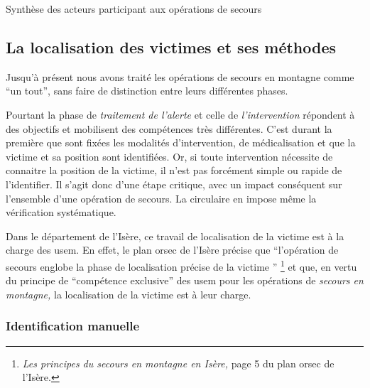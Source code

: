 \begin{table}
  \centering
  
  \caption{Synthèse des acteurs participant aux opérations de secours}
  \label{tbl:org_sec}
\end{table}

\subsection{La localisation des victimes et ses méthodes}
\label{susec:1-1-2}



Jusqu'à présent nous avons traité les opérations de secours en
montagne comme \enquote{un tout}, sans faire de distinction entre
leurs différentes phases.

%
Pourtant la phase de \emph{traitement de l'alerte} et celle de
\emph{l'intervention} répondent à des objectifs et mobilisent des
compétences très différentes. C'est durant la première que sont fixées
les modalités d'intervention, de médicalisation et que la victime et
sa position sont identifiées. Or, si toute intervention nécessite de
connaitre la position de la victime, il n'est pas forcément simple ou
rapide de l'identifier. Il s'agit donc d'une étape critique, avec un
impact conséquent sur l'ensemble d'une opération de secours.
%
La circulaire  en impose même la vérification systématique.



Dans le département de l'Isère, ce travail de localisation de la
victime est à la charge des \ac{usem}. En effet, le plan \ac{orsec} de
l'Isère précise que \enquote{l’opération de secours \textelp{} englobe
  la phase de localisation précise de la victime \textelp{}}
\footnote{\emph{Les principes du secours en montagne en Isère,} page 5
  du plan \ac{orsec} de l'Isère.} et que, en vertu du principe de
\enquote{compétence exclusive} des \ac{usem} pour les opérations de
\emph{secours en montagne,} la localisation de la victime est à leur
charge.


\subsubsection{Identification manuelle}
\label{subsec:1-1-2-1}

